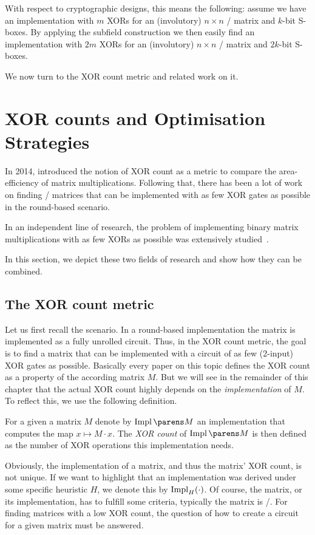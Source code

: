 With respect to cryptographic designs, this means the following: assume we have an implementation with $m$ XORs for an (involutory) $n \times n$ \MDS/ matrix and $k$-bit S-boxes.
By applying the subfield construction we then easily find an implementation with $2m$ XORs for an (involutory) $n \times n$ \MDS/ matrix and $2k$-bit S-boxes.

We now turn to the XOR count metric and related work on it.

\section{XOR counts and Optimisation Strategies}

In 2014, \textcite{CHES:KPPY14} introduced the notion of XOR count as a metric to compare the area-efficiency of matrix multiplications.
Following that, there has been a lot of work~ on finding \MDS/ matrices that can be implemented with as few XOR gates as possible in the round-based scenario.

In an independent line of research, the problem of implementing binary matrix multiplications with as few XORs as possible was extensively studied~.

In this section, we depict these two fields of research and show how they can be combined.

\subsection{The XOR count metric}
Let us first recall the scenario. In a round-based implementation the matrix is implemented as a fully unrolled circuit.
Thus, in the XOR count metric, the goal is to find a matrix that can be implemented with a circuit of as few (2-input) XOR gates as possible.
Basically every paper on this topic defines the XOR count as a property of the according matrix $M$.
But we will see in the remainder of this chapter that the actual XOR count highly depends on the \emph{implementation} of $M$.
To reflect this, we use the following definition.
\begin{definition}\label{def:xor-count}
    For a given a matrix $M$ denote by $\impl{M}$ an implementation that computes the map $x \mapsto M \cdot x$.
    The \emph{XOR count} of $\impl{M}$ is then defined as the number of XOR operations this implementation needs.
\end{definition}
Obviously, the implementation of a matrix, and thus the matrix' XOR count, is not unique.
If we want to highlight that an implementation was derived under some specific heuristic $H$, we denote this by $\operatorname{Impl}_H(\cdot)$.
Of course, the matrix, or its implementation, has to fulfill some criteria, typically the matrix is \MDS/.
For finding matrices with a low XOR count, the question of how to create a circuit for a given matrix must be answered.

